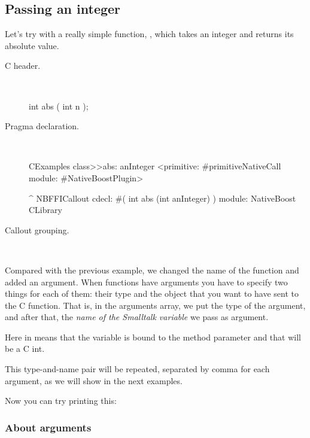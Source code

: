 \documentclass[a4paper,10pt,twoside]{book}
\begin{document}
\subsection{Passing an integer}

Let's try with a really simple function, , which takes
an integer and returns its absolute value.

\begin{description}
\item [C header.] \ 

\begin{code}{}
int abs ( int n );
\end{code}

\item [Pragma declaration.] \ 

\begin{code}{}
CExamples class>>abs: anInteger
	<primitive: #primitiveNativeCall module: #NativeBoostPlugin>
	
	^ NBFFICallout cdecl: #( int abs (int anInteger) ) module: NativeBoost CLibrary
\end{code}


\item [Callout grouping.] \ 
 

\end{description}


Compared with the previous example, we changed the name of the function and added an argument. 
When functions have arguments you have to specify two things for each of them:
their type and the object that you want to have sent to the C function. That is, in the arguments array, we put the type
of the argument, and after that, the \emph{name of the Smalltalk variable} we pass as argument. 

Here  in  means that the variable is bound to the  method parameter and that will
be a C int. 

This type-and-name pair will be repeated, separated by comma for each argument,
as we will show in the next examples. 


Now you can try printing this:


\subsubsection{About arguments}
\end{document}
